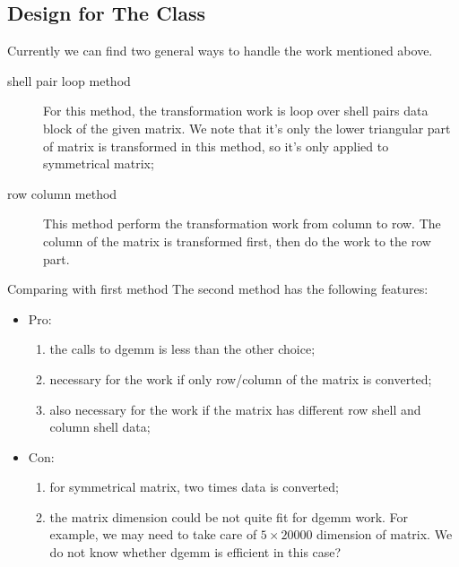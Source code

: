 \subsection{Design for The Class}

Currently we can find two general ways to handle the work mentioned above.

\begin{description}
 \item[shell pair loop method] For this method, the transformation work
 is loop over shell pairs data block of the given matrix. We note that 
 it's only the lower triangular part of matrix is transformed in this 
 method, so it's only applied to symmetrical matrix;
\item[row column method] This method perform the transformation work
from column to row. The column of the matrix is transformed first, then
do the work to the row part.
\end{description}

Comparing with first method The second method has the following features:
\begin{itemize}
 \item Pro:
  \begin{enumerate}
   \item   the calls to dgemm is less than the other choice;
   \item   necessary for the work if only row/column of the matrix is converted;
   \item   also necessary for the work if the matrix has different row shell and 
           column shell data;
  \end{enumerate}
 \item Con:
   \begin{enumerate}
    \item for symmetrical matrix, two times data is converted;
    \item the matrix dimension could be not quite fit for dgemm work. For example,
		    we may need to take care of $5\times 20000$ dimension of matrix. We do not 
          know whether dgemm is efficient in this case?
   \end{enumerate}
\end{itemize}

